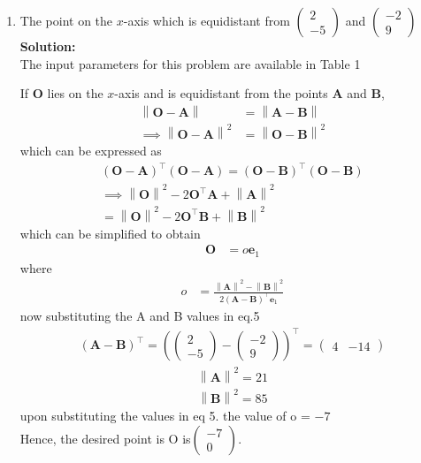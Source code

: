 \documentclass[12pt]{article}
\providecommand{\brak}[1]{\ensuremath{\left(#1\right)}}
\providecommand{\norm}[1]{\left\lVert#1\right\rVert}
\newcommand{\solution}{\noindent \textbf{Solution: }}
\newcommand{\myvec}[1]{\ensuremath{\begin{pmatrix}#1\end{pmatrix}}}
\let\vec\mathbf
\begin{document}
\begin{enumerate}

\item The point on the $x$-axis which is equidistant from $\myvec{2 \\ -5}$ and $\myvec{-2\\9}$\\

\solution \\The input parameters for this problem are available in Table 1
\begin{center}
\begin{table}[ht!]
	
\caption{}
\label{table}	
\end{table}
\end{center}

  If $\vec{O}$ lies on the  $x$-axis and is  equidistant from the points $\vec{A}$ and $\vec{B}$, 
\begin{align}
 \norm{\vec{O}-\vec{A}} &=
\norm{\vec{A}-\vec{B}} 
\\
 \implies \norm{\vec{O}-\vec{A}}^2 &=
\norm{\vec{O}-\vec{B}}^2 
\end{align}
which can be expressed as 
\begin{multline}
 \brak{\vec{O}-\vec{A}}^{\top} \brak{\vec{O}-\vec{A}}=
 \brak{\vec{O}-\vec{B}}^{\top} 
\brak{\vec{O}-\vec{B}}
\\
 \implies \norm{\vec{O}}^2-2{\vec{O}}^{\top}\vec{A} + \norm{\vec{A}}^2
 \\= \norm{\vec{O}}^2-2{\vec{O}}^{\top}\vec{B} + \norm{\vec{B}}^2
\end{multline}
which can be simplified to obtain
  \begin{align}
   \vec{O} &=
    o\vec{e}_1
  \end{align}
  where 
  \begin{align}
   o &=\frac{\norm{\vec{A}}^2 -\norm{\vec{B}}^2 }{2\brak{\vec{A}-\vec{B}}^{\top }\vec{e}_1
}  
  \end{align}
  now substituting the A and B values in eq.5
\begin{align}
 \brak{\vec{A}-\vec{B}}^{\top}=
 \brak{\myvec{2 \\ -5}-\myvec{-2\\9}}^{\top}
 =\myvec{4 & -14}
\end{align}
  \begin{align}
   \norm{\vec{A}}^2 = 21
    \end{align}
 \begin{align}
   \norm{\vec{B}}^2 = 85
    \end{align}
upon   substituting the values in eq 5. the value of o = $ -7$
\\Hence, the desired point is O is$\myvec{ -7 \\ 0}$.


\end{enumerate}
\end{document}
